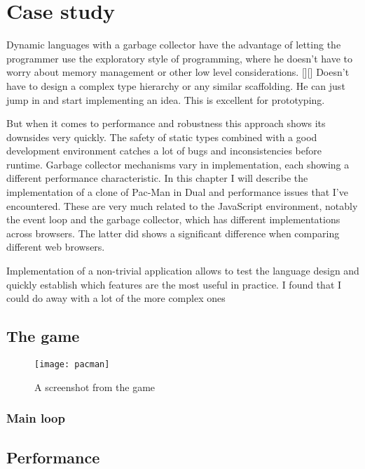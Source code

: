 \chapter{Case study}\label{chap:case}
Dynamic languages with a garbage collector have the advantage of letting the programmer use the exploratory style of programming, where he doesn't have to worry about memory management or other low level considerations. [][] Doesn't have to design a complex type hierarchy or any similar scaffolding. He can just jump in and start implementing an idea. This is excellent for prototyping.

But when it comes to performance and robustness this approach shows its downsides very quickly. The safety of static types combined with a good development environment catches a lot of bugs and inconsistencies before runtime. Garbage collector mechanisms vary in implementation, each showing a different performance characteristic. In this chapter I will describe the implementation of a clone of Pac-Man in Dual and performance issues that I've encountered. These are very much related to the JavaScript environment, notably the event loop and the garbage collector, which has different implementations across browsers. The latter did shows a significant difference when comparing different web browsers.

Implementation of a non-trivial application allows to test the language design and quickly establish which features are the most useful in practice.
I found that I could do away with a lot of the more complex ones %

\section{The game}
\begin{figure}[h!]
\centering
\texttt{[image: pacman]}
\caption{A screenshot from the game}
\label{fig:pacman}
\end{figure}


\subsection{Main loop}

\section{Performance}


